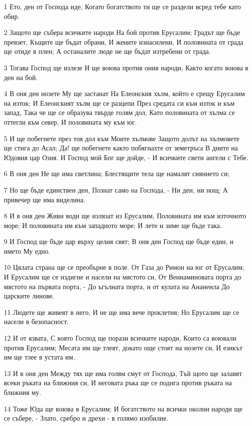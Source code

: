 \par 1 Ето, ден от Господа иде, Когато богатството ти ще се раздели всред тебе като обир.
\par 2 Защото ще събера всичките народи На бой против Ерусалим; Градът ще бъде превзет, Къщите ще бъдат обрани, И жените изнасилени, И половината от града ще отиде в плен; А останалите люде не ще бъдат изтребени от града.
\par 3 Тогава Господ ще излезе И ще воюва против ония народи, Както когато воюва в ден на бой.
\par 4 В оня ден нозете Му ще застанат На Елеонския хълм, който е срещу Ерусалим на изток; И Елеонският хълм ще се разцепи През средата си към изток и към запад, Така че ще се образува твърде голям дол, Като половината от хълма се оттегли към север, И половината му към юг.
\par 5 И ще побегнете през тоя дол към Моите хълмове Защото долът на хълмовете ще стига до Асал; Да! ще побегнете както побягнахте от земетръса В дните на Юдовия цар Озия. И Господ мой Бог ще дойде, - И всичките свети ангели с Тебе.
\par 6 В оня ден Не ще има светлина; Блестящите тела ще намалят сиянието си;
\par 7 Но ще бъде единствен ден, Познат само на Господа, - Ни ден, ни нощ; А привечер ще има виделина.
\par 8 И в оня ден Живи води ще излязат из Ерусалим, Половината им към източното море; И половината им към западното море; И лете и зиме ще бъде така.
\par 9 И Господ ще бъде цар върху целия свят; В оня ден Господ ще бъде един, и името Му едно.
\par 10 Цялата страна ще се преобърне в поле. От Газа до Римон на юг от Ерусалим; И Ерусалим ще се издигне и насели на мястото си, От Вениаминовата порта до мястото на първата порта, - До ъгълната порта, и от кулата на Ананеила До царските линове.
\par 11 Людете ще живеят в него, И не ще има вече проклетия; Но Ерусалим ще се насели в безопасност.
\par 12 И от язвата, С която Господ ще порази всичките народи, Които са воювали против Ерусалим; Месата им ще тлеят, докато още стоят на нозете си, И езикът им ще тлее в устата им.
\par 13 И в оня ден Между тях ще има голям смут от Господа, Тъй щото ще залавят всеки ръката на ближния си, И неговата ръка ще се подига против ръката на ближния му.
\par 14 Тоже Юда ще воюва в Ерусалим; И богатството на всички околни народи ще се събере, - Злато, сребро и дрехи - в голямо изобилие.
